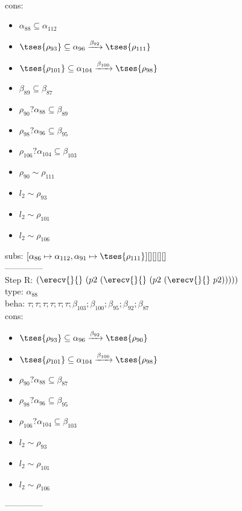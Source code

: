 \documentclass[12pt]{article}
\begin{document}
 \\ cons: \begin{itemize}
\item $ \alpha_{88} \subseteq \alpha_{112} $
\item $  \tses{ \rho_{93}} \subseteq \alpha_{96} \xrightarrow{\beta_{92}}  \tses{ \rho_{111}} $
\item $  \tses{ \rho_{101}} \subseteq \alpha_{104} \xrightarrow{\beta_{100}}  \tses{ \rho_{98}} $
\item $ \beta_{89} \subseteq \beta_{87} $
\item $ \rho_{90}?\alpha_{88} \subseteq \beta_{89} $
\item $ \rho_{98}?\alpha_{96} \subseteq \beta_{95} $
\item $ \rho_{106}?\alpha_{104} \subseteq \beta_{103} $
\item $ \rho_{90} \sim\rho_{111} $
\item $ l_{2} \sim\rho_{93} $
\item $ l_{2} \sim\rho_{101} $
\item $ l_{2} \sim\rho_{106} $
\end{itemize}
 subs:  $ [ \alpha_{86}\mapsto\alpha_{112}, \alpha_{91}\mapsto \tses{ \rho_{111}}] [] [] [] [] $ 
  \\--------------\\ 
Step R: $ (\erecv{}{}~(p2~(\erecv{}{}~(p2~(\erecv{}{}~p2))))) $\\
  type: $ \alpha_{88} $ 
\\  beha: $ \tau; \tau; \tau; \tau; \tau; \tau; \beta_{103}; \beta_{100}; \beta_{95}; \beta_{92}; \beta_{87} $ 
\\  cons: \begin{itemize}
\item $  \tses{ \rho_{93}} \subseteq \alpha_{96} \xrightarrow{\beta_{92}}  \tses{ \rho_{90}} $
\item $  \tses{ \rho_{101}} \subseteq \alpha_{104} \xrightarrow{\beta_{100}}  \tses{ \rho_{98}} $
\item $ \rho_{90}?\alpha_{88} \subseteq \beta_{87} $
\item $ \rho_{98}?\alpha_{96} \subseteq \beta_{95} $
\item $ \rho_{106}?\alpha_{104} \subseteq \beta_{103} $
\item $ l_{2} \sim\rho_{93} $
\item $ l_{2} \sim\rho_{101} $
\item $ l_{2} \sim\rho_{106} $
\end{itemize} 
  --------------\\ 
\end{document}
